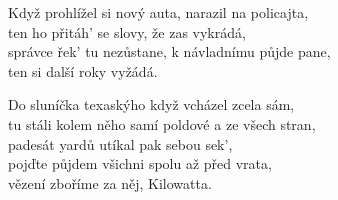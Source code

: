 \ve{}
Když prohlížel si nový auta, narazil na policajta,\\
ten ho přitáh' se slovy, že zas vykrádá,\\
správce řek' tu nezůstane, k návladnímu půjde pane,\\
ten si další roky vyžádá. 

\cho{}
Do sluníčka texaskýho když vcházel zcela sám,\\
tu stáli kolem něho samí poldové a ze všech stran,\\
padesát yardů utíkal pak sebou sek',\\
pojďte půjdem všichni spolu až před vrata,\\
vězení zboříme za něj, Kilowatta. 

\esong{}
